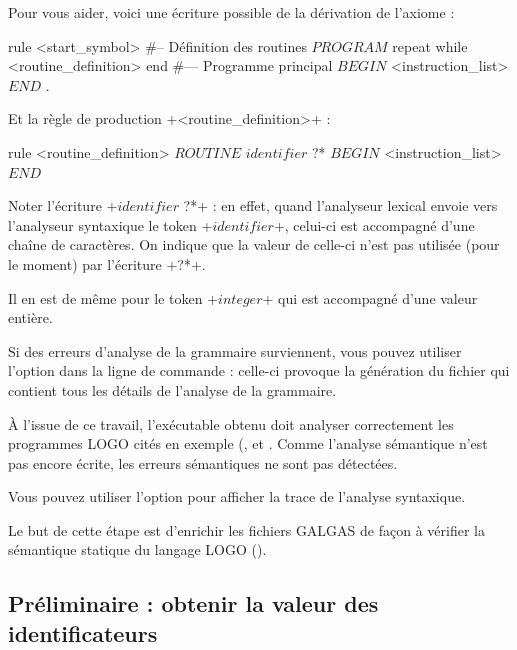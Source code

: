 Pour vous aider, voici une écriture possible de la dérivation de l'axiome :

\begin{galgas}
rule <start_symbol> {
#-- Définition des routines
  $PROGRAM$
  repeat
  while
    <routine_definition>
  end
#--- Programme principal
  $BEGIN$
  <instruction_list> 
  $END$
  $.$
}
\end{galgas}

Et la règle de production \ggs+<routine_definition>+ :

\begin{galgas}
rule <routine_definition> {
  $ROUTINE$
  $identifier$ ?*
  $BEGIN$
  <instruction_list>
  $END$
}
\end{galgas}

Noter l’écriture \ggs+$identifier$ ?*+ : en effet, quand l’analyseur lexical envoie vers l’analyseur syntaxique le token \ggs+$identifier$+, celui-ci est accompagné d’une chaîne de caractères. On indique que la valeur de celle-ci n’est pas utilisée (pour le moment) par l’écriture \ggs+?*+.

Il en est de même pour le token \ggs+$integer$+ qui est accompagné d’une valeur entière.

Si des erreurs d'analyse de la grammaire surviennent, vous pouvez utiliser l'option  dans la ligne de commande : celle-ci provoque la génération du fichier \- qui contient tous les détails de l'analyse de la grammaire.

À l'issue de ce travail, l'exécutable obtenu doit analyser correctement les programmes LOGO cités en exemple (,   et . Comme l'analyse sémantique n'est pas encore écrite, les erreurs sémantiques ne sont pas détectées.

Vous pouvez utiliser l'option  pour afficher la trace de l'analyse syntaxique.








Le but de cette étape est d'enrichir les fichiers GALGAS de façon à vérifier la sémantique statique du langage LOGO ().

\subsection{Préliminaire : obtenir la valeur des identificateurs}

